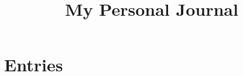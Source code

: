 \documentclass[11pt, paper=a4, bibliography=totocnumbered]{scrbook}
\begin{document}
\title{My Personal Journal}
\author{}
\date{}

\maketitle

\tableofcontents

\printindex

\chapter{Entries}

%
%
% 
% 
% 

% 
% 
% 
% 
% 
% 
% 
% 
% 
% 
% 
% 
% 
% 
% 
% 
% 
% 
% 
% 
% 
% 
% 
% 
% 
% 
% 
% 
% 
% 
% 
% 
% 
% 
% 
% 
% 
% 
% 
% 
% 
% 
% 
\end{document}
